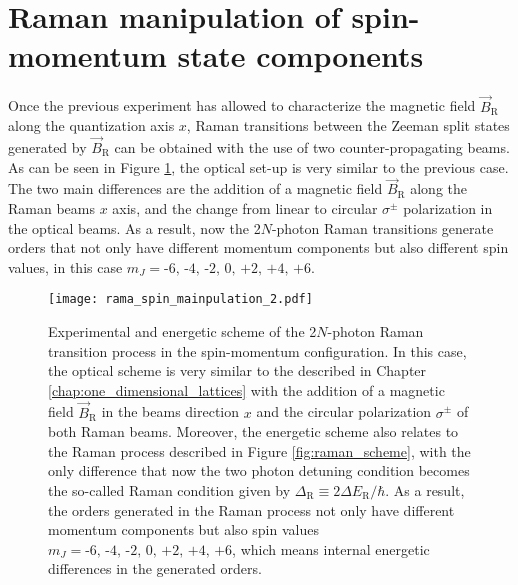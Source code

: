 \section{Raman manipulation of spin-momentum state components}\label{sec:raman_manipulation_theory}

Once the previous experiment has allowed to characterize the magnetic field $\vec{B}_{\text{R}}$ along the quantization axis $x$, Raman transitions between the Zeeman split states generated by $\vec{B}_{\text{R}}$ can be obtained with the use of two counter-propagating beams. As can be seen in Figure \ref{fig:raman_manipulation}, the optical set-up is very similar to the previous case. The two main differences are the addition of a magnetic field $\vec{B}_\text{R}$ along the Raman beams $x$ axis, and the change from linear to circular $\sigma^\pm$ polarization in the optical beams. As a result, now the 2$N$-photon Raman transitions generate orders that not only have different momentum components but also different spin values, in this case $m_J = \text{-6, -4, -2, 0, +2, +4, +6}$.

\begin{figure}[!htbp]\centering
	\texttt{[image: rama\_spin\_mainpulation\_2.pdf]}
	\caption[Experimental and energetic scheme of the 2$N$-photon Raman transition process in the spin-momentum configuration]{Experimental and energetic scheme of the 2$N$-photon Raman transition process in the spin-momentum configuration. In this case, the optical scheme is very similar to the described in Chapter \ref{chap:one_dimensional_lattices} with the addition of a magnetic field $\vec{B}_\text{R}$ in the beams direction $x$ and the circular polarization $\sigma^\pm$ of both Raman beams. Moreover, the energetic scheme also relates to the Raman process described in Figure \ref{fig:raman_scheme}, with the only difference that now the two photon detuning condition becomes the so-called Raman condition given by $\Delta_\text{R} \equiv 2\Delta E_\text{R}/\hbar$. As a result, the orders generated in the Raman process not only have different momentum components but also spin values  $m_J = \text{-6, -4, -2, 0, +2, +4, +6}$, which means internal energetic differences in the generated orders. }\label{fig:raman_manipulation}
\end{figure}


